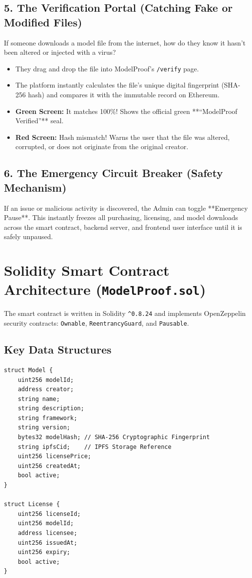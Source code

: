 \documentclass[12pt,a4paper]{article}
\begin{document}
\subsection{5. The Verification Portal (Catching Fake or Modified Files)}
If someone downloads a model file from the internet, how do they know it hasn't been altered or injected with a virus?
\begin{itemize}[leftmargin=1.5em]
    \item They drag and drop the file into ModelProof's \texttt{/verify} page.
    \item The platform instantly calculates the file's unique digital fingerprint (SHA-256 hash) and compares it with the immutable record on Ethereum.
    \item \textbf{Green Screen:} It matches 100\%! Shows the official green **``ModelProof Verified\texttrademark''** seal.
    \item \textbf{Red Screen:} Hash mismatch! Warns the user that the file was altered, corrupted, or does not originate from the original creator.
\end{itemize}

\subsection{6. The Emergency Circuit Breaker (Safety Mechanism)}
If an issue or malicious activity is discovered, the Admin can toggle **Emergency Pause**. This instantly freezes all purchasing, licensing, and model downloads across the smart contract, backend server, and frontend user interface until it is safely unpaused.

\section{Solidity Smart Contract Architecture (\texttt{ModelProof.sol})}

The smart contract is written in Solidity \texttt{\^{}0.8.24} and implements OpenZeppelin security contracts: \texttt{Ownable}, \texttt{ReentrancyGuard}, and \texttt{Pausable}.

\subsection{Key Data Structures}
\begin{lstlisting}[language=Solidity, caption={Data Structures in ModelProof.sol}]
struct Model {
    uint256 modelId;
    address creator;
    string name;
    string description;
    string framework;
    string version;
    bytes32 modelHash; // SHA-256 Cryptographic Fingerprint
    string ipfsCid;    // IPFS Storage Reference
    uint256 licensePrice;
    uint256 createdAt;
    bool active;
}

struct License {
    uint256 licenseId;
    uint256 modelId;
    address licensee;
    uint256 issuedAt;
    uint256 expiry;
    bool active;
}
\end{lstlisting}
\end{document}
